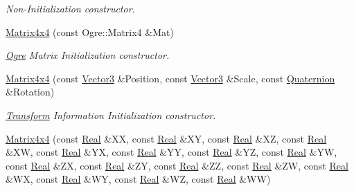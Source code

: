 \begin{DoxyCompactItemize}
\begin{DoxyCompactList}\small\item\em Non-\/Initialization constructor. \item\end{DoxyCompactList}\item 
\hyperlink{classMezzanine_1_1Matrix4x4_a135b5021758ab1e94236691bbe28df68}{Matrix4x4} (const Ogre::Matrix4 \&Mat)
\begin{DoxyCompactList}\small\item\em \hyperlink{namespaceOgre}{Ogre} Matrix Initialization constructor. \item\end{DoxyCompactList}\item 
\hyperlink{classMezzanine_1_1Matrix4x4_a72142ef87b57f85a672ffedd1fc8525d}{Matrix4x4} (const \hyperlink{classMezzanine_1_1Vector3}{Vector3} \&Position, const \hyperlink{classMezzanine_1_1Vector3}{Vector3} \&Scale, const \hyperlink{classMezzanine_1_1Quaternion}{Quaternion} \&Rotation)
\begin{DoxyCompactList}\small\item\em \hyperlink{classMezzanine_1_1Transform}{Transform} Information Initialization constructor. \item\end{DoxyCompactList}\item 
\hyperlink{classMezzanine_1_1Matrix4x4_a02ee16f22f14fc8632b901379606001c}{Matrix4x4} (const \hyperlink{namespaceMezzanine_a726731b1a7df72bf3583e4a97282c6f6}{Real} \&XX, const \hyperlink{namespaceMezzanine_a726731b1a7df72bf3583e4a97282c6f6}{Real} \&XY, const \hyperlink{namespaceMezzanine_a726731b1a7df72bf3583e4a97282c6f6}{Real} \&XZ, const \hyperlink{namespaceMezzanine_a726731b1a7df72bf3583e4a97282c6f6}{Real} \&XW, const \hyperlink{namespaceMezzanine_a726731b1a7df72bf3583e4a97282c6f6}{Real} \&YX, const \hyperlink{namespaceMezzanine_a726731b1a7df72bf3583e4a97282c6f6}{Real} \&YY, const \hyperlink{namespaceMezzanine_a726731b1a7df72bf3583e4a97282c6f6}{Real} \&YZ, const \hyperlink{namespaceMezzanine_a726731b1a7df72bf3583e4a97282c6f6}{Real} \&YW, const \hyperlink{namespaceMezzanine_a726731b1a7df72bf3583e4a97282c6f6}{Real} \&ZX, const \hyperlink{namespaceMezzanine_a726731b1a7df72bf3583e4a97282c6f6}{Real} \&ZY, const \hyperlink{namespaceMezzanine_a726731b1a7df72bf3583e4a97282c6f6}{Real} \&ZZ, const \hyperlink{namespaceMezzanine_a726731b1a7df72bf3583e4a97282c6f6}{Real} \&ZW, const \hyperlink{namespaceMezzanine_a726731b1a7df72bf3583e4a97282c6f6}{Real} \&WX, const \hyperlink{namespaceMezzanine_a726731b1a7df72bf3583e4a97282c6f6}{Real} \&WY, const \hyperlink{namespaceMezzanine_a726731b1a7df72bf3583e4a97282c6f6}{Real} \&WZ, const \hyperlink{namespaceMezzanine_a726731b1a7df72bf3583e4a97282c6f6}{Real} \&WW)

\end{DoxyCompactItemize}

